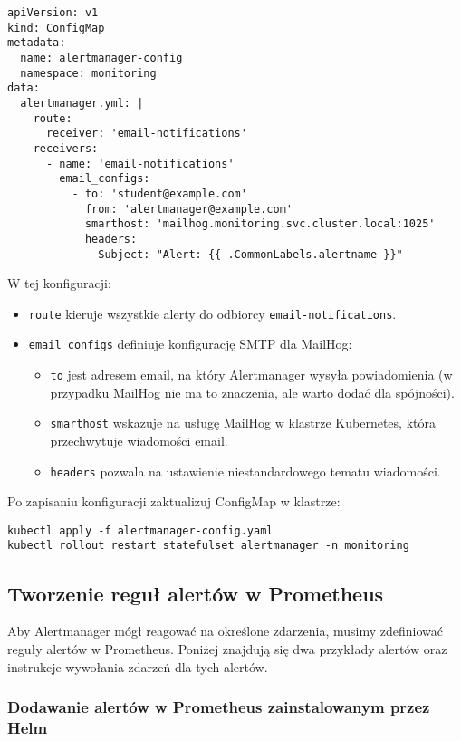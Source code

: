 \documentclass{article}
\begin{document}
\begin{lstlisting}
apiVersion: v1
kind: ConfigMap
metadata:
  name: alertmanager-config
  namespace: monitoring
data:
  alertmanager.yml: |
    route:
      receiver: 'email-notifications'
    receivers:
      - name: 'email-notifications'
        email_configs:
          - to: 'student@example.com'
            from: 'alertmanager@example.com'
            smarthost: 'mailhog.monitoring.svc.cluster.local:1025'
            headers:
              Subject: "Alert: {{ .CommonLabels.alertname }}"
\end{lstlisting}

W tej konfiguracji:
\begin{itemize}
\item \texttt{route} kieruje wszystkie alerty do odbiorcy \texttt{email-notifications}.
\item \texttt{email\_configs} definiuje konfigurację SMTP dla MailHog:
  \begin{itemize}
    \item \texttt{to} jest adresem email, na który Alertmanager wysyła powiadomienia (w przypadku MailHog nie ma to znaczenia, ale warto dodać dla spójności).
    \item \texttt{smarthost} wskazuje na usługę MailHog w klastrze Kubernetes, która przechwytuje wiadomości email.
    \item \texttt{headers} pozwala na ustawienie niestandardowego tematu wiadomości.
    \end{itemize}
\end{itemize}
Po zapisaniu konfiguracji zaktualizuj ConfigMap w klastrze:

\begin{lstlisting}
kubectl apply -f alertmanager-config.yaml
kubectl rollout restart statefulset alertmanager -n monitoring
\end{lstlisting}

\subsection{Tworzenie reguł alertów w Prometheus}

Aby Alertmanager mógł reagować na określone zdarzenia, musimy zdefiniować reguły alertów w Prometheus. Poniżej znajdują się dwa przykłady alertów oraz instrukcje wywołania zdarzeń dla tych alertów.


\subsubsection{Dodawanie alertów w Prometheus zainstalowanym przez Helm}
\end{document}
